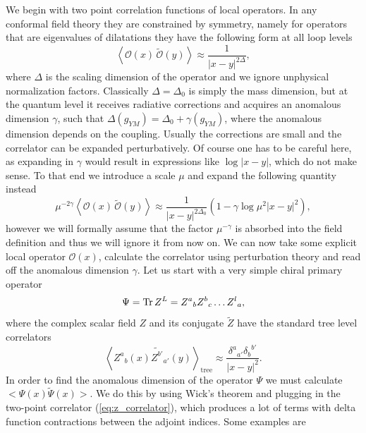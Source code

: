 We begin with two point correlation functions of local operators.
In any conformal field theory they are constrained by symmetry, namely for operators that are eigenvalues of dilatations they have the following form at all loop levels
\begin{equation}
	\left< \mathcal{O}(x) \, \tilde{\mathcal{O}}(y) \right> \approx \frac{1}{|x-y|^{2\Delta}},
\end{equation}
where $\Delta$ is the scaling dimension of the operator and we ignore unphysical normalization factors. 
Classically $\Delta = \Delta_0$ is simply the mass dimension, but at the quantum level it receives radiative corrections and acquires an anomalous dimension $\gamma$, such that $\Delta(g_{YM}) = \Delta_0 + \gamma(g_{YM})$, where the anomalous dimension depends on the coupling. 
Usually the corrections are small and the correlator can be expanded perturbatively.
Of course one has to be careful here, as expanding in $\gamma$ would result in expressions like $\log|x-y|$, which do not make sense. 
To that end we introduce a scale $\mu$ and expand the following quantity instead 
\begin{equation}
	\mu^{-2\gamma} \left< \mathcal{O}(x) \, \tilde{\mathcal{O}}(y) \right> \approx \frac{1}{|x-y|^{2\Delta_0}} \left(1 - \gamma \log \mu^2 |x-y|^2 \right),
	\label{eq:anomdim_expansion}
\end{equation}
however we will formally assume that the factor $\mu^{-\gamma}$ is absorbed into the field definition and thus we will ignore it from now on. We can now take some explicit local operator $\mathcal{O}(x)$, calculate the correlator using perturbation theory and read off the anomalous dimension $\gamma$.
Let us start with a very simple chiral primary operator 
\begin{equation}
	\Psi = \mathrm{Tr} \, Z^L  = {Z^a}_b {Z^b}_c \dots {Z^l}_a,
	\label{eq:primary_op}
\end{equation}
where the complex scalar field $Z$ and its conjugate $\tilde{Z}$ have the standard tree level correlators
\begin{equation}
	\left< {Z^a}_b(x) {{\tilde{Z^{b'}}}}_{a'}(y) \right>_{\mathrm{tree}} \approx \frac{{\delta^a}_{a'} {\delta_b}^{b'}}{|x-y|^{2}}.
	\label{eq:z_correlator}
\end{equation}  
In order to find the anomalous dimension of the operator $\Psi$ we must calculate $<\Psi(x) \tilde{\Psi}(x)>$. We do this by using Wick's theorem and plugging in the two-point correlator (\ref{eq:z_correlator}), which produces a lot of terms with delta function contractions between the adjoint indices. Some examples are
